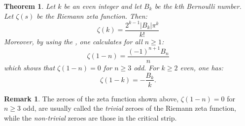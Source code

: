 \documentclass[12pt]{article}
\newtheorem*{thm}{Theorem}
\theoremstyle{definition}
\newtheorem*{rem}{Remark}
\begin{document}
\begin{thm}
Let $k$ be an even integer and let $B_k$ be the $k$th Bernoulli number. Let $\zeta(s)$ be the Riemann zeta function. Then:
$$\zeta(k)=\frac{2^{k-1}|B_k|\pi^k}{k!}$$
Moreover, by using the 
, one calculates for all $n\geq 1$:
$$\zeta(1-n)=\frac{(-1)^{n+1}B_n}{n}$$
which shows that $\zeta(1-n)=0$ for $n\geq 3$ odd. For $k\geq 2$ even, one has:
$$\zeta(1-k)=-\frac{B_k}{k}.$$
\end{thm}
\begin{rem}
The zeroes of the zeta function shown above, $\zeta(1-n)=0$ for $n\geq 3$ odd, are usually called the {\it trivial} zeroes of the Riemann zeta function, while the {\it non-trivial} zeroes are those in the critical strip. 
\end{rem}
\end{document}
